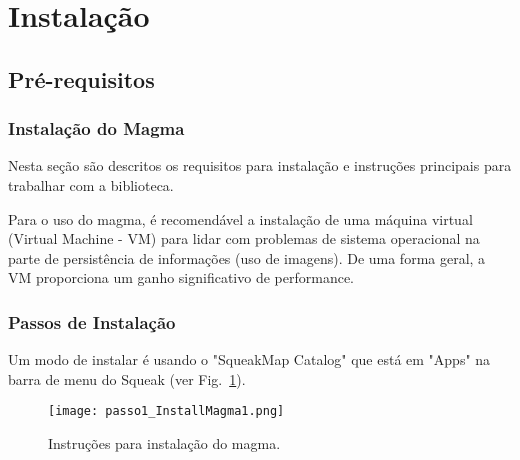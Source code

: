 \section{Instalação}

\subsection{Pré-requisitos}

\subsubsection{Instalação do Magma}
Nesta seção são descritos os requisitos para instalação e instruções principais para trabalhar com a biblioteca.

Para o uso do magma, é recomendável a instalação de uma máquina virtual (Virtual Machine - VM) para lidar com problemas de sistema operacional na parte de persistência de informações (uso de imagens). De uma forma geral, a VM proporciona um ganho significativo de performance.

\subsubsection{Passos de Instalação}

Um modo de instalar é usando o "SqueakMap Catalog" que está em "Apps" na barra de menu do Squeak (ver Fig.~\ref{fig:passo1_InstallMagma1}).

\begin{figure}[!htb]
\centering
\texttt{[image: passo1\_InstallMagma1.png]}
\caption{Instruções para instalação do magma.}
\label{fig:passo1_InstallMagma1}
\end{figure}

